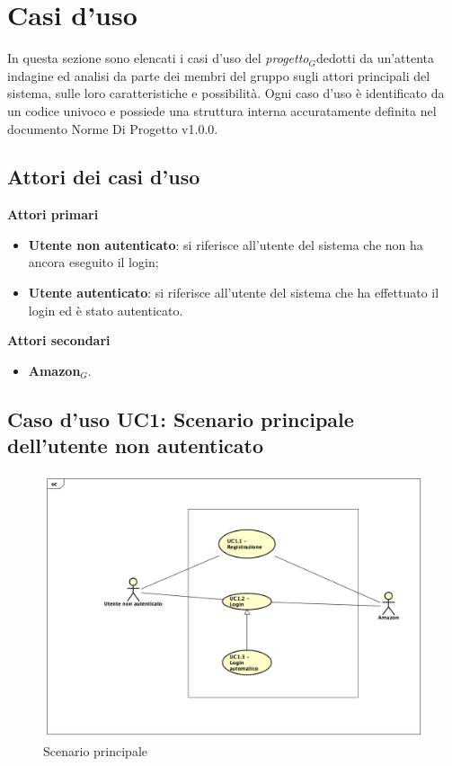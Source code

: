 \chapter{Casi d'uso} \label{CasiD'Uso}
In questa sezione sono elencati i casi d'uso del \textit{progetto$_{G}$}dedotti da un'attenta indagine ed analisi da parte dei membri del gruppo sugli attori principali del sistema, sulle loro caratteristiche e possibilità.
Ogni caso d'uso è identificato da un codice univoco e possiede una struttura interna accuratamente definita nel documento Norme Di Progetto 
v1.0.0.
\section{Attori dei casi d'uso}
\textbf{Attori primari}
\begin{itemize}
	\item \textbf{Utente non autenticato}: si riferisce all'utente del sistema che non ha ancora eseguito il login;
	\item \textbf{Utente autenticato}: si riferisce all'utente del sistema che ha effettuato il login ed è stato autenticato.
\end{itemize}
\textbf{Attori secondari}
\begin{itemize}
	\item \textbf{Amazon$_{G}$}.
\end{itemize}

\section{Caso d'uso UC1: Scenario principale dell'utente non autenticato}

\begin{figure}[h]
	\centering
	\includegraphics[scale=0.4]{Diagram/UC1.png}
	\caption{Scenario principale}\label{}
\end{figure}


